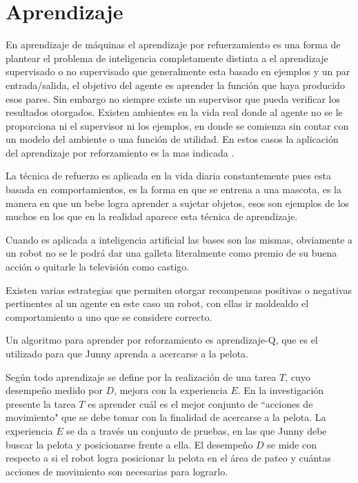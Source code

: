 
\section{Aprendizaje}\label{aprendizaje}
En aprendizaje de m\'aquinas el aprendizaje por refuerzamiento es una forma de plantear el problema de inteligencia completamente distinta a el aprendizaje supervisado o no supervisado que generalmente esta basado en ejemplos y un par entrada/salida, el objetivo del agente es aprender la funci\'on que haya producido esos pares. Sin embargo no siempre existe un supervisor que pueda verificar los resultados otorgados.
Existen ambientes en la vida real donde al agente no se le proporciona ni el supervisor ni los ejemplos, en donde se comienza sin contar con un modelo del ambiente o una funci\'on de utilidad. En estos casos la aplicaci\'on del aprendizaje por reforzamiento es la mas indicada \cite{peterAndNorvig}.

La t\'ecnica de refuerzo es aplicada en la vida diaria constantemente pues esta basada en comportamientos, es la forma en que se entrena a una mascota, es la manera en que un bebe logra aprender a sujetar objetos, esos son ejemplos de los muchos en los que en la realidad aparece esta t\'ecnica de aprendizaje.

Cuando es aplicada a inteligencia artificial las bases son las mismas, obviamente a un robot no se le podr\'a dar una galleta literalmente como premio de su buena acci\'on o quitarle la televisi\'on como castigo.
 
Existen varias estrategias que permiten otorgar recompensas positivas o negativas pertinentes al un agente en este caso un robot, con ellas ir moldealdo el comportamiento a uno que se considere correcto.

Un algoritmo para aprender por reforzamiento es aprendizaje-Q, que es el utilizado para que Junny aprenda a acercarse a la pelota.
 


Según \cite{Mitchell} todo aprendizaje se define por la realización de una tarea $T$, cuyo desempeño medido por $D$, mejora con la experiencia $E$. En la investigación presente la tarea $T$ es aprender cuál es el mejor conjunto de ``acciones de movimiento" que se debe tomar con la finalidad de acercarse a la pelota. La experiencia $E$ se da a través un conjunto de pruebas, en las que Junny debe buscar la pelota y posicionarse frente a ella. El desempeño $D$ se mide con respecto a si el robot logra posicionar la pelota en el área de pateo y cuántas acciones de movimiento son necesarias para lograrlo.

